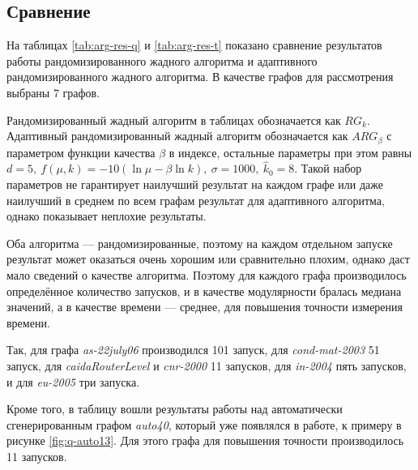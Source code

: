 
\subsection{Сравнение}
\label{subsec:arg-res}

На таблицах \ref{tab:arg-res-q} и \ref{tab:arg-res-t} показано сравнение результатов работы рандомизированного жадного алгоритма и адаптивного рандомизированного жадного алгоритма. В качестве графов для рассмотрения выбраны 7 графов.

Рандомизированный жадный алгоритм в таблицах обозначается как $RG_k$. Адаптивный рандомизированный жадный алгоритм обозначается как $ARG_{\beta}$ с параметром функции качества $\beta$ в индексе, остальные параметры при этом равны $d = 5,\ f(\mu, k) = -10 (\ln \mu - \beta \ln k),\ \sigma = 1000,\ \hat{k}_0 = 8$. Такой набор параметров не гарантирует наилучший результат на каждом графе или даже наилучший в среднем по всем графам результат для адаптивного алгоритма, однако показывает неплохие результаты.

Оба алгоритма --- рандомизированные, поэтому на каждом отдельном запуске результат может оказаться очень хорошим или сравнительно плохим, однако даст мало сведений о качестве алгоритма. Поэтому для каждого графа производилось определённое количество запусков, и в качестве модулярности бралась медиана значений, а в качестве времени --- среднее, для повышения точности измерения времени.

Так, для графа \emph{as-22july06} производился 101 запуск, для \emph{cond-mat-2003} 51 запуск, для \emph{caidaRouterLevel} и \emph{cnr-2000} 11 запусков, для \emph{in-2004} пять запусков, и для \emph{eu-2005} три запуска.%

Кроме того, в таблицу вошли результаты работы над автоматически сгенерированным графом \emph{auto40}, который уже появлялся в работе, к примеру в рисунке \ref{fig:q-auto13}. Для этого графа для повышения точности производилось 11 запусков.

